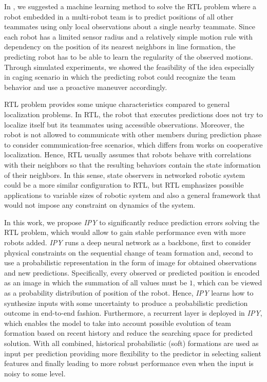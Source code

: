 \documentclass[letterpaper, 10 pt, conference]{ieeeconf}  %
\begin{document}
	In \cite{Choi17}, we suggested a machine learning method to solve the 
	RTL problem where a robot embedded in a multi-robot team is to predict 
	positions of all other teammates using only local observations about a single nearby teammate. 
	Since each robot has a limited sensor radius and a relatively simple motion rule with dependency 
	on the position of its nearest neighbors in line formation, 
	the predicting robot has to be able to learn the regularity 
	of the observed motions. Through simulated experiments, we showed the feasibility of the idea 
	especially in caging scenario in which the predicting robot could recognize the team behavior and 
	use a proactive maneuver accordingly. 
	
	RTL problem provides some unique characteristics compared to general localization problems. 
	In RTL, the robot that executes predictions does not try to localize itself but its teammates using 
	accessible observations. 
	Moreover, the robot is not allowed to communicate with other members during prediction phase to 
	consider communication-free scenarios, which differs from works on cooperative localization. 
	Hence, RTL usually assumes that robots behave with correlations with their neighbors so that 
	the resulting behaviors contain the state information of their neighbors. 	
	In this sense, state observers in networked robotic system could be a more similar 
	configuration to RTL, but RTL emphasizes 
	possible applications to variable sizes of robotic system and also a general framework 
	that would not impose any constraint on dynamics of the system.
	
	In this work, we propose \emph{IPY} to significantly reduce prediction errors solving 
	the RTL problem, which would allow to gain stable performance even with more robots added. 
	\emph{IPY} runs a deep neural network as a backbone, 
	first to consider physical constraints on the sequential change of team formation and, 
	second to use a probabilistic representation in the form of image for obtained observations and 
	new predictions. Specifically, every observed or predicted position is 
	encoded as an image in which the summation of all values must be $1$, which can be
	viewed as a probability distribution of position of the robot. Hence,
	\emph{IPY} learns how to synthesize inputs with some uncertainty to produce a probabilistic 
	prediction outcome in end-to-end fashion. Furthermore, a recurrent layer is deployed in \emph{IPY}, 
	which enables the model to take into account possible evolution of 
	team formation based on recent history and reduce the searching space for predicted solution. 
	With all combined, historical probabilistic (soft) formations are used as input per prediction
	providing more flexibility to the predictor in selecting salient features and finally leading to 
	more robust performance even when the input is noisy to some level.
	
\end{document}
